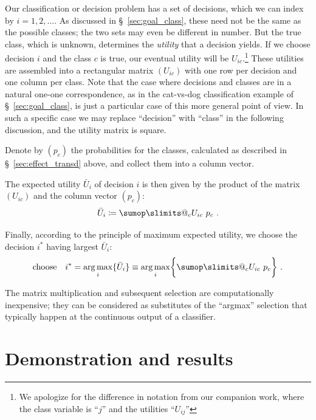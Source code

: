 \documentclass[\ifafour a4paper,12pt,\else a5paper,10pt,\fi%
onecolumn,oneside,article,%
british%
]{memoir}
\makeatletter
\theoremstyle{remark}
\theoremstyle{innote}
\def\sum{\DOTSI\sumop\slimits@}
\newcommand*{\defd}{\coloneqq}
\DeclarePairedDelimiter\set{\{}{\}} %
\renewcommand*{\|}[1][]{\nonscript\:#1\vert\nonscript\:\mathopen{}}
\newcommand*{\sect}{\S}%
\DeclareMathOperator*{\argmax}{arg\,max}
\newcommand*{\eu}{\bar{U}}
\makeatother
\begin{document}
Our classification or decision problem has a set of decisions, which we can index by $i = 1,2,\dotsc$. As discussed in \sect~\ref{sec:goal_class}, these need not be the same as the possible classes; the two sets may even be different in number. But the true class, which is unknown, determines the \emph{utility} that a decision yields. If we choose decision $i$ and the class $c$ is true, our eventual utility will be $U_{ic}$.\footnote{We apologize for the difference in notation from our companion work, where the class variable is \enquote{$j$} and the utilities \enquote{$U_{ij}$}} These utilities are assembled into a rectangular matrix $(U_{ic})$ with one row per decision and one column per class. Note that the case where decisions and classes are in a natural one-one correspondence, as in the cat-vs-dog classification example of \sect~\ref{sec:goal_class}, is just a particular case of this more general point of view. In such a specific case we may replace \enquote{decision} with \enquote{class} in the following discussion, and the utility matrix is square.

Denote by $(p_{c})$ the probabilities for the classes, calculated as described in \sect~\ref{sec:effect_transd} above, and collect them into a column vector.

The expected utility $\eu_{i}$ of decision $i$ is then given by the product of the matrix $(U_{ic})$ and the column vector $(p_{c})$:
\begin{equation}
  \label{eq:expe_utilities}
  \eu_{i} \defd \sum_{c} U_{ic}\ p_{c} \ .
\end{equation}

Finally, according to the principle of maximum expected utility, we choose the decision $i^{*}$ having largest $\eu_{i}$:
\begin{equation}
  \label{eq:max_expe_utility}
  \text{choose}\quad
  i^{*} = \argmax_{i}\set{\eu_{i}} \equiv \argmax_{i}\set[\bigg]{\sum_{c} U_{ic}\ p_{c}} \ .
\end{equation}

The matrix multiplication and subsequent selection are computationally inexpensive; they can be considered as substitutes of the \enquote{argmax} selection that typically happen at the continuous output of a classifier.

\section{Demonstration and results}
\label{sec:demonstration}
\end{document}
